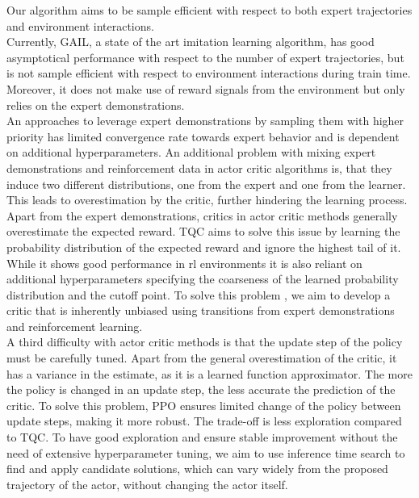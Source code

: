 Our algorithm aims to be sample efficient with respect to both expert trajectories and environment interactions. \\

Currently, GAIL, a state of the art imitation learning algorithm, has good asymptotical performance with respect to the number of expert trajectories, but is not sample efficient 
with respect to environment interactions during train time. Moreover, it does not make use of reward signals from the environment but only relies on the expert demonstrations.\\ 

An approaches to leverage expert demonstrations by sampling them with higher priority \cite{vecerik2018leveraging} has limited convergence rate towards expert behavior and is dependent on additional hyperparameters. 
An additional problem with mixing expert demonstrations and reinforcement data in actor critic algorithms is, that they induce two different distributions, one from the expert and one from 
the learner. This leads to overestimation by the critic, further hindering the learning process. \\

Apart from the expert demonstrations, critics in actor critic methods generally overestimate the expected reward. TQC \cite{TQC_Paper} aims to solve this issue by learning the 
probability distribution of the expected reward and ignore the highest tail of it. While it shows good performance in \ac{rl} environments 
it is also reliant on additional hyperparameters 
specifying the coarseness of the learned probability distribution and the cutoff point. To solve this problem , we aim to develop a critic that is inherently unbiased using transitions from expert demonstrations 
and reinforcement learning.\\

A third difficulty with actor critic methods is that the update step of the policy must be carefully tuned. Apart from the general overestimation of the critic, it has a variance in the estimate, 
as it is a learned function approximator. The more the policy is changed in an update step, the less accurate the prediction of the critic. To solve this problem, PPO ensures limited change of the policy 
between update steps, making it more robust. The trade-off is less exploration compared to TQC. To have good exploration 
and ensure stable improvement without the need of extensive hyperparameter tuning, we aim to use inference time search to find and apply candidate solutions, which can vary widely from the 
proposed trajectory of the actor, without changing the actor itself. \\

